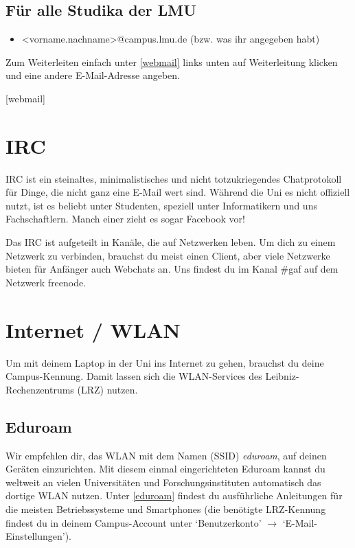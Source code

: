 \begin{urlList}
\end{urlList}

\subsection*{Für alle Studika der LMU}
\begin{itemize}
	\item[]<vorname.nachname>@campus.lmu.de (bzw. was ihr angegeben habt)
\end{itemize}
Zum Weiterleiten einfach unter \ref{webmail} links unten auf Weiterleitung klicken und eine andere E-Mail-Adresse angeben.

\begin{urlList}
	[webmail]
\end{urlList}

\section{IRC}
IRC ist ein steinaltes, minimalistisches und nicht totzukriegendes
Chatprotokoll für Dinge, die nicht ganz eine E-Mail wert sind. Während die Uni
es nicht offiziell nutzt, ist es beliebt unter Studenten, speziell unter
Informatikern und uns Fachschaftlern. Manch einer zieht es sogar Facebook vor!

Das IRC ist aufgeteilt in Kanäle, die auf Netzwerken leben. Um dich zu einem
Netzwerk zu verbinden, brauchst du meist einen Client, aber viele Netzwerke
bieten für Anfänger auch Webchats an. Uns findest du im Kanal \#gaf auf dem
Netzwerk freenode.

\begin{urlList}
\end{urlList}



\section{Internet / WLAN}
Um mit deinem Laptop in der Uni ins Internet zu gehen, brauchst du
deine Campus-Kennung. Damit lassen sich die WLAN-Services des
Leibniz-Rechen\-zentrums (LRZ) nutzen.

\subsection*{Eduroam}
Wir empfehlen dir, das WLAN mit dem Namen (SSID) \emph{eduroam}, auf deinen Geräten einzurichten. Mit diesem einmal eingerichteten Eduroam kannst du weltweit an vielen Universitäten und Forschungsinstituten automatisch das dortige WLAN nutzen. Unter \ref{eduroam} findest du ausführliche Anleitungen für die meisten Betriebssysteme und Smart\-phones 
(die benötigte LRZ-Kennung findest du in deinem Campus-Account unter `Benutzerkonto' $\rightarrow$ `E-Mail-Einstellungen').

